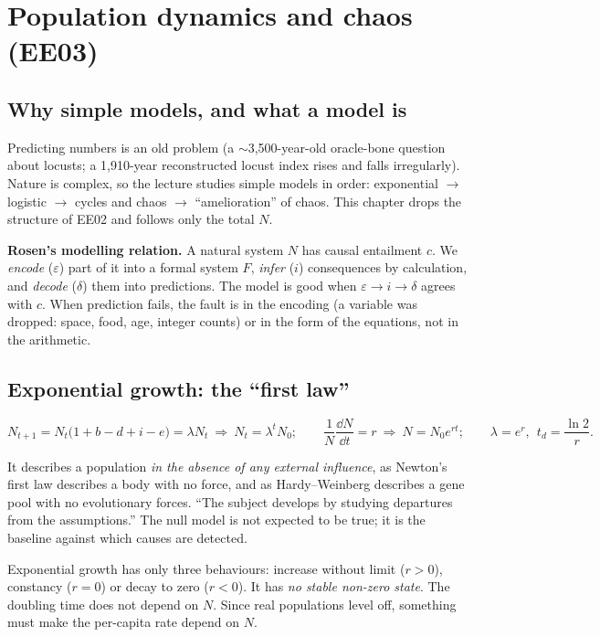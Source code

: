 \section{Population dynamics and chaos (EE03)}

\subsection{Why simple models, and what a model is}
Predicting numbers is an old problem (a $\sim$3{,}500-year-old oracle-bone question about locusts; a 1{,}910-year
reconstructed locust index rises and falls irregularly). Nature is complex, so the lecture studies simple models in
order: exponential $\to$ logistic $\to$ cycles and chaos $\to$ ``amelioration'' of chaos. This chapter drops the
structure of EE02 and follows only the total $N$.

\textbf{Rosen's modelling relation.} A natural system $N$ has causal entailment $c$. We \emph{encode} ($\varepsilon$)
part of it into a formal system $F$, \emph{infer} ($i$) consequences by calculation, and \emph{decode} ($\delta$) them
into predictions. The model is good when $\varepsilon\to i\to\delta$ agrees with $c$. When prediction fails, the fault
is in the encoding (a variable was dropped: space, food, age, integer counts) or in the form of the equations, not in
the arithmetic.

\subsection{Exponential growth: the ``first law''}
\[
N_{t+1}=N_t\bigl(1+b-d+i-e\bigr)=\lambda N_t\ \Rightarrow\ N_t=\lambda^tN_0;\qquad
\frac{1}{N}\frac{\dd N}{\dd t}=r\ \Rightarrow\ N=N_0e^{rt};\qquad \lambda=e^{r},\ \ t_d=\frac{\ln 2}{r}.
\]

\begin{keyidea}
It describes a population \emph{in the absence of any external influence}, as Newton's first law describes a body with
no force, and as Hardy--Weinberg describes a gene pool with no evolutionary forces. ``The subject develops by
studying departures from the assumptions.'' The null model is not expected to be true; it is the baseline against
which causes are detected.
\end{keyidea}

Exponential growth has only three behaviours: increase without limit ($r>0$), constancy ($r=0$) or decay to zero
($r<0$). It has \emph{no stable non-zero state}. The doubling time does not depend on $N$. Since real populations
level off, something must make the per-capita rate depend on $N$.

